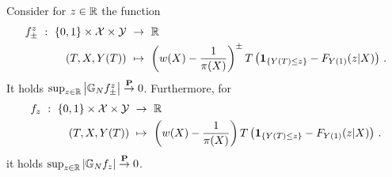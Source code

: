 \begin{lemma}
  \label{lemma_fpm}
 Consider for $z\in\mathbb{R}$ the function
 \begin{align*}
    f_{\pm}^z
    \ 
    :
    \ 
      \left\{ 0,1 \right\}
      \times
      \mathcal{X}
      \times
      \mathcal{Y}
    &
    \ 
    \to
    \ 
    \R
    \\
      (T,X,Y(T))
    &
      \ 
      \mapsto
      \ 
      \left( 
      w(X)-\frac{1}{\pi(X)}
      \right)
      ^{\pm}
      T
      \left( 
        \mathbf{1}
        _{\left\{ Y(T)\le z \right\}}
        -
        F_{Y(1)}(z|X)
      \right)
      \,.
  \end{align*}
  It holds
  $\sup_{z\in\mathbb{R}}\left| \mathbb{G}_N f^z_\pm \right|\overset{\mathbf{P}}{\to}0$.
  Furthermore, for
 \begin{align*}
    f_z
    \ 
    :
    \ 
      \left\{ 0,1 \right\}
      \times
      \mathcal{X}
      \times
      \mathcal{Y}
    &
    \ 
    \to
    \ 
    \R
    \\
      (T,X,Y(T))
    &
      \ 
      \mapsto
      \ 
      \left( 
      w(X)-\frac{1}{\pi(X)}
      \right)
      T
      \left( 
        \mathbf{1}
        _{\left\{ Y(T)\le z \right\}}
        -
        F_{Y(1)}(z|X)
      \right)
      \,.
  \end{align*}
  it holds
  $\sup_{z\in\mathbb{R}}\left| \mathbb{G}_N f_z \right|\overset{\mathbf{P}}{\to}0$.
\end{lemma}
